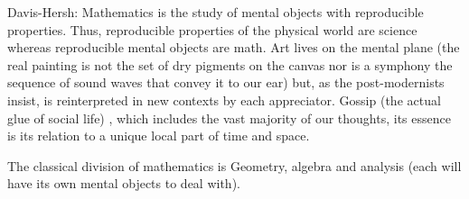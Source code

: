 \documentclass[onecollarge,runningheads]{svjour2}
\begin{document}

Davis-Hersh: Mathematics is the study of mental objects with reproducible properties. Thus, reproducible
properties of the physical world are science whereas reproducible mental
objects are math. Art lives on the mental plane (the real painting is not
the set of dry pigments on the canvas nor is a symphony the sequence of
sound waves that convey it to our ear) but, as the post-modernists insist,
is reinterpreted in new contexts by each appreciator. Gossip (the actual glue of social life) , which
includes the vast majority of our thoughts, its essence is its relation to a
unique local part of time and space.

The classical division of mathematics is Geometry, algebra and analysis (each will have its own mental objects to deal with).
\end{document}
